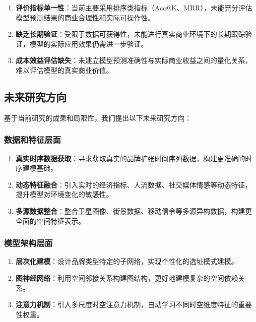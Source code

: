 \documentclass{article}
\begin{document}
\begin{enumerate}
\item \textbf{评价指标单一性}：当前主要采用排序类指标（Acc@K、MRR），未能充分评估模型预测结果的商业合理性和实际可操作性。

\item \textbf{缺乏长期验证}：受限于数据可获得性，未能进行真实商业环境下的长期跟踪验证，模型的实际应用效果仍需进一步验证。

\item \textbf{成本效益评估缺失}：未建立模型预测准确性与实际商业收益之间的量化关系，难以评估模型的真实商业价值。
\end{enumerate}

\subsection{未来研究方向}

基于当前研究的成果和局限性，我们提出以下未来研究方向：

\subsubsection{数据和特征层面}

\begin{enumerate}
\item \textbf{真实时序数据获取}：寻求获取真实的品牌扩张时间序列数据，构建更准确的时序建模基础。

\item \textbf{动态特征融合}：引入实时的经济指标、人流数据、社交媒体情感等动态特征，提升模型对环境变化的敏感性。

\item \textbf{多源数据整合}：整合卫星图像、街景数据、移动信令等多源异构数据，构建更全面的空间特征表示。
\end{enumerate}

\subsubsection{模型架构层面}

\begin{enumerate}
\item \textbf{层次化建模}：设计品牌类型特定的子网络，实现个性化的选址模式建模。

\item \textbf{图神经网络}：利用空间邻接关系构建图结构，更好地建模复杂的空间依赖关系。

\item \textbf{注意力机制}：引入多尺度时空注意力机制，自动学习不同时空维度特征的重要性权重。
\end{enumerate}
\end{document}
